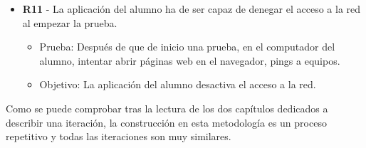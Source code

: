 \begin{itemize}
    \item {\bfseries R11} - La aplicación del alumno ha de ser capaz de denegar el acceso a la red al empezar la prueba.

    \begin{itemize}

        \item Prueba: Después de que de inicio una prueba, en el computador del alumno, intentar abrir páginas web en el navegador, pings a equipos.
        \item Objetivo: La aplicación del alumno desactiva el acceso a la red.
    \end{itemize}

\end{itemize}

Como se puede comprobar tras la lectura de los dos capítulos dedicados a describir una iteración, la construcción en esta metodología es un proceso repetitivo y todas las iteraciones son muy similares. 